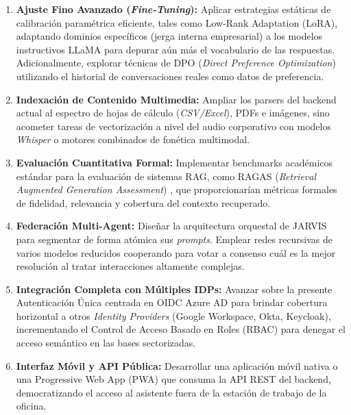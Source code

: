 \begin{enumerate}
    \item \textbf{Ajuste Fino Avanzado (\textit{Fine-Tuning}):} Aplicar estrategias estáticas de calibración paramétrica eficiente, tales como Low-Rank Adaptation (LoRA), adaptando dominios específicos (jerga interna empresarial) a los modelos instructivos LLaMA para depurar aún más el vocabulario de las respuestas. Adicionalmente, explorar técnicas de DPO (\textit{Direct Preference Optimization}) utilizando el historial de conversaciones reales como datos de preferencia.

    \item \textbf{Indexación de Contenido Multimedia:} Ampliar los parsers del backend actual al espectro de hojas de cálculo (\textit{CSV/Excel}), PDFs e imágenes, sino acometer tareas de vectorización a nivel del audio corporativo con modelos \textit{Whisper} o motores combinados de fonética multimodal.

    \item \textbf{Evaluación Cuantitativa Formal:} Implementar benchmarks académicos estándar para la evaluación de sistemas RAG, como RAGAS (\textit{Retrieval Augmented Generation Assessment}) \cite{es2023ragas}, que proporcionarían métricas formales de fidelidad, relevancia y cobertura del contexto recuperado.

    \item \textbf{Federación Multi-Agent:} Diseñar la arquitectura orquestal de JARVIS para segmentar de forma atómica sus \textit{prompts}. Emplear redes recursivas de varios modelos reducidos cooperando para votar a consenso cuál es la mejor resolución al tratar interacciones altamente complejas.

    \item \textbf{Integración Completa con Múltiples IDPs:} Avanzar sobre la presente Autenticación Única centrada en OIDC Azure AD para brindar cobertura horizontal a otros \textit{Identity Providers} (Google Workspace, Okta, Keycloak), incrementando el Control de Acceso Basado en Roles (RBAC) para denegar el acceso semántico en las bases sectorizadas.

    \item \textbf{Interfaz Móvil y API Pública:} Desarrollar una aplicación móvil nativa o una Progressive Web App (PWA) que consuma la API REST del backend, democratizando el acceso al asistente fuera de la estación de trabajo de la oficina.
\end{enumerate}

